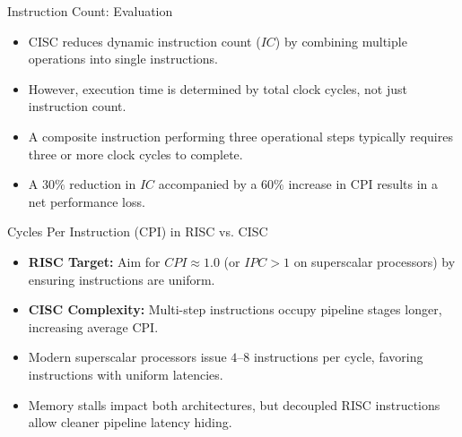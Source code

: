 \documentclass[aspectratio=169,11pt,t]{beamer}
\newcommand{\key}[1]{\textbf{#1}}
\begin{document}

\begin{frame}{Instruction Count: Evaluation}
\large
\begin{itemize}\setlength{\itemsep}{8pt}
  \item CISC reduces dynamic instruction count ($\mathit{IC}$) by combining multiple operations into single instructions.
  \item However, execution time is determined by total clock cycles, not just instruction count.
  \item A composite instruction performing three operational steps typically requires three or more clock cycles to complete.
  \item A $30\%$ reduction in $\mathit{IC}$ accompanied by a $60\%$ increase in CPI results in a net performance loss.
\end{itemize}
\end{frame}


\begin{frame}{Cycles Per Instruction (CPI) in RISC vs. CISC}
\large
\begin{itemize}\setlength{\itemsep}{8pt}
  \item \key{RISC Target:} Aim for $\mathit{CPI} \approx 1.0$ (or $\mathit{IPC} > 1$ on superscalar processors) by ensuring instructions are uniform.
  \item \key{CISC Complexity:} Multi-step instructions occupy pipeline stages longer, increasing average CPI.
  \item Modern superscalar processors issue $4\text{--}8$ instructions per cycle, favoring instructions with uniform latencies.
  \item Memory stalls impact both architectures, but decoupled RISC instructions allow cleaner pipeline latency hiding.
\end{itemize}
\end{frame}

\end{document}

